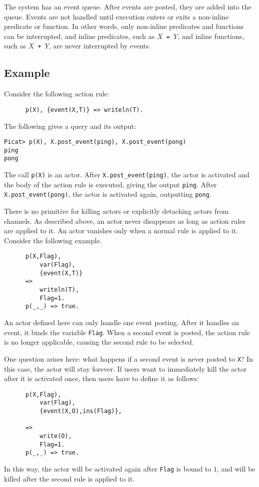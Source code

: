 The system has an event queue. After events are posted, they are added into the queue. Events are not handled until execution enters or exits a non-inline predicate or function. In other words, only non-inline predicates and functions can be interrupted, and inline predicates, such as \texttt{$X$ = $Y$}, and inline functions, such as \texttt{$X$ + $Y$}, are never interrupted by events.

\subsection*{Example}
Consider the following action rule:
\begin{verbatim}
      p(X), {event(X,T)} => writeln(T).
\end{verbatim}
The following gives a query and its output:
\begin{verbatim}
Picat> p(X), X.post_event(ping), X.post_event(pong)
ping
pong
\end{verbatim}
The call \texttt{p(X)} is an actor. After {\tt X.post\_event(ping)}, the actor is activated and the body of the action rule is executed, giving the output {\tt ping}. After \texttt{X.post\_event(pong)}, the actor is activated again, outputting {\tt pong}.


There is no primitive for killing actors or explicitly detaching actors from channels. As described above, an actor never disappears as long as action rules are applied to it. An actor vanishes only when a normal rule is applied to it. Consider the following example.
\begin{verbatim}
      p(X,Flag), 
          var(Flag), 
          {event(X,T)}
      => 
          writeln(T),
          Flag=1.
      p(_,_) => true.
\end{verbatim}
An actor defined here can only handle one event posting. After it handles an event, it binds the variable \texttt{Flag}. When a second event is posted, the action rule is no longer applicable, causing the second rule to be selected.

One question arises here: what happens if a second event is never posted to \texttt{X}? In this case, the actor will stay forever. If users want to immediately kill the actor after it is activated once, then users have to define it as follows:
\begin{verbatim}
      p(X,Flag), 
          var(Flag), 
          {event(X,O),ins(Flag)},

      => 
          write(O),
          Flag=1.
      p(_,_) => true.
\end{verbatim}
In this way, the actor will be activated again after \texttt{Flag} is bound to $1$, and will be killed after the second rule is applied to it.


